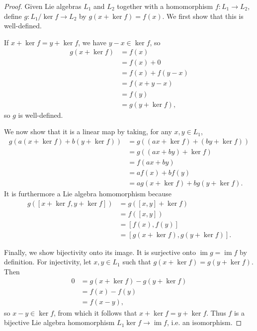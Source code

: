\documentclass[12pt]{article}
\DeclareMathOperator{\im}{im}
\theoremstyle{definition}
\begin{document}
\begin{proof}
	Given Lie algebras $L_1$ and $L_2$ together with a homomorphism $f : L_1 \to L_2$, define $g : L_1/\ker f \to L_2$ by $g(x + \ker f) = f(x)$.
	We first show that this is well-defined.

	If $x + \ker f = y + \ker f$, we have $y - x \in \ker f$, so \begin{align*}
		g(x + \ker f) & = f(x)            \\
		              & = f(x) + 0        \\
		              & = f(x) + f(y - x) \\
		              & = f(x + y - x)    \\
		              & = f(y)            \\
		              & = g(y + \ker f),
	\end{align*}
	so $g$ is well-defined.

	We now show that it is a linear map by taking, for any $x, y \in L_1$, \begin{align*}
		g(a(x + \ker f) + b(y + \ker f)) & = g((ax + \ker f) + (by + \ker f)) \\
		                                 & = g((ax + by) + \ker f)            \\
		                                 & = f(ax + by)                       \\
		                                 & = af(x) + bf(y)                    \\
		                                 & = ag(x + \ker f) + bg(y + \ker f).
	\end{align*}
	It is furthermore a Lie algebra homomorphism because \begin{align*}
		g([x + \ker f, y + \ker f]) & = g([x, y] + \ker f)              \\
		                            & = f([x, y])                       \\
		                            & = [f(x), f(y)]                    \\
		                            & = [g(x + \ker f), g(y + \ker f)].
	\end{align*}

	Finally, we show bijectivity onto its image.
	It is surjective onto $\im g = \im f$ by definition.
	For injectivity, let $x, y \in L_1$ such that $g(x + \ker f) = g(y + \ker f)$.
	Then \begin{align*}
		0 & = g(x + \ker f) - g(y + \ker  f) \\
		  & = f(x) - f(y)                    \\
		  & = f(x - y),
	\end{align*}
	so $x - y \in \ker f$, from which it follows that $x + \ker f = y + \ker f$.
	Thus $f$ is a bijective Lie algebra homomorphism $L_1\ker f \to \im f$, i.e. an isomorphism.
\end{proof}
\end{document}

